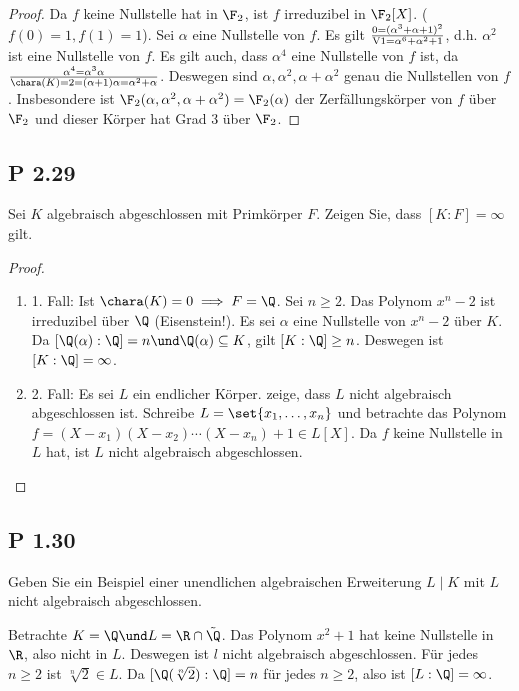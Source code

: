 \begin{proof}
	Da $f$ keine Nullstelle hat in $\F_2$, ist $f$ irreduzibel in $\F_2[X]$. ($f(0) = 1, f(1) = 1$). Sei $\alpha$ eine Nullstelle von $f$. Es gilt $0 = (\alpha^3 + \alpha +1)^2 \over{\text{V1}}{=} \alpha^6 + \alpha^2 +1$, d.h. $\alpha^2$ ist eine Nullstelle von $f$. Es gilt auch, dass $\alpha^4$ eine Nullstelle von $f$ ist, da
	$\alpha^4 = \alpha^3 \alpha \over{\chara(K) =2}{=} (\alpha+1)\alpha = \alpha^2 +\alpha$. Deswegen sind $\alpha, \alpha^2, \alpha + \alpha^2$ genau die Nullstellen von $f$. Insbesondere ist $\F_2 (\alpha, \alpha^2, \alpha + \alpha^2) = \F_2 (\alpha)$ der Zerfällungskörper von $f$ über $\F_2$ und dieser Körper hat Grad 3 über $\F_2$.
\end{proof}


\subsection{P 2.29}
Sei $K$ algebraisch abgeschlossen mit Primkörper $F$. Zeigen Sie, dass $[K:F] = \infty$ gilt.

\begin{proof}\
	\begin{enumerate}[label=]
		\item 1. Fall: Ist $\chara(K) = 0 \implies F = \Q$. Sei $n \ge 2$. Das Polynom $x^n -2$ ist irreduzibel über $\Q$ (Eisenstein!). Es sei $\alpha$ eine Nullstelle von $x^n -2$ über $K$. Da $[\Q(\alpha) : \Q] = n \und \Q(\alpha) \subseteq K$, gilt $[K:\Q] \ge n$. Deswegen ist $[K:\Q] = \infty$.
		\item 2. Fall: Es sei $L$ ein endlicher Körper. zeige, dass $L$ nicht algebraisch abgeschlossen ist. Schreibe $L = \set{x_1 , \dots, x_n}$ und betrachte das Polynom $f = (X - x_1)(X - x_2)\cdots (X-x_n) + 1 \in L[X]$. Da $f$ keine Nullstelle in $L$ hat, ist $L$ nicht algebraisch abgeschlossen. 
	\end{enumerate}
\end{proof}


\subsection{P 1.30}
Geben Sie ein Beispiel einer unendlichen algebraischen Erweiterung $L\mid K$ mit $L$ nicht algebraisch abgeschlossen.
\begin{lösung}
	Betrachte $K = \Q \und L = \R \cap \tilde{\Q}$. Das Polynom $x^2 +1$ hat keine Nullstelle in $\R$, also nicht in $L$. Deswegen ist $l$ nicht algebraisch abgeschlossen. Für jedes $n \ge 2$ ist $\sqrt[n]{2} \in L$. Da $[\Q(\sqrt[n]{2}):\Q] = n$ für jedes $n \ge 2$, also ist $[L:\Q] = \infty$.
\end{lösung}